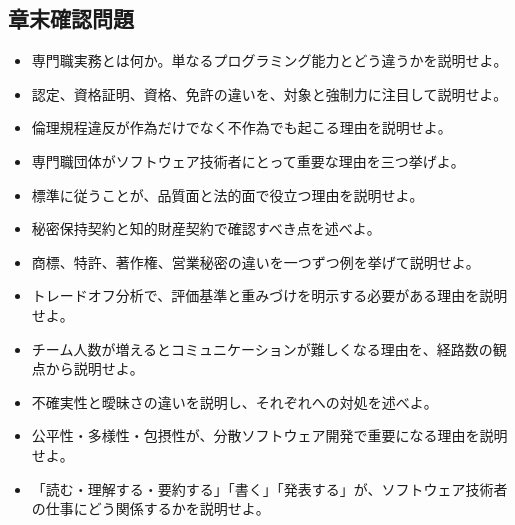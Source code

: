 \subsection*{章末確認問題}


\begin{itemize}[leftmargin=2em]

\item 専門職実務とは何か。単なるプログラミング能力とどう違うかを説明せよ。

\item 認定、資格証明、資格、免許の違いを、対象と強制力に注目して説明せよ。

\item 倫理規程違反が作為だけでなく不作為でも起こる理由を説明せよ。

\item 専門職団体がソフトウェア技術者にとって重要な理由を三つ挙げよ。

\item 標準に従うことが、品質面と法的面で役立つ理由を説明せよ。

\item 秘密保持契約と知的財産契約で確認すべき点を述べよ。

\item 商標、特許、著作権、営業秘密の違いを一つずつ例を挙げて説明せよ。

\item トレードオフ分析で、評価基準と重みづけを明示する必要がある理由を説明せよ。

\item チーム人数が増えるとコミュニケーションが難しくなる理由を、経路数の観点から説明せよ。

\item 不確実性と曖昧さの違いを説明し、それぞれへの対処を述べよ。

\item 公平性・多様性・包摂性が、分散ソフトウェア開発で重要になる理由を説明せよ。

\item 「読む・理解する・要約する」「書く」「発表する」が、ソフトウェア技術者の仕事にどう関係するかを説明せよ。

\end{itemize}

\begin{center}
\end{center}
